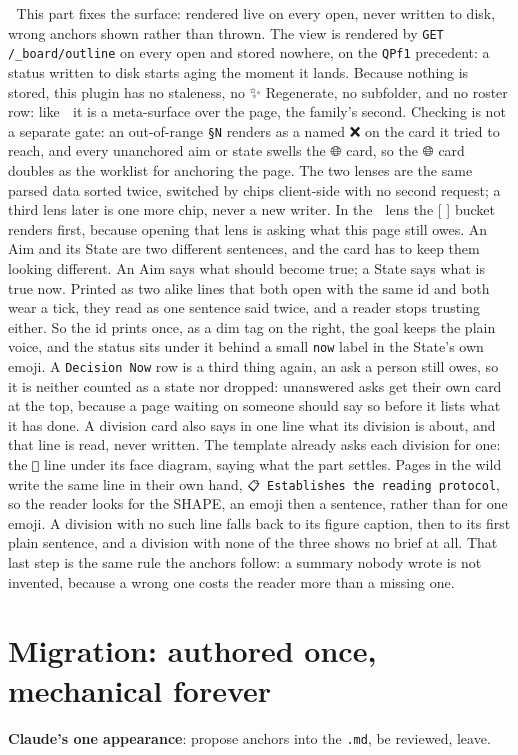 📌 This part fixes the surface: rendered live on every open, never written to disk, wrong anchors shown rather than thrown. The view is rendered by \texttt{GET /\_board/outline} on every open and stored nowhere, on the \texttt{QPf1} precedent: a status written to disk starts aging the moment it lands. Because nothing is stored, this plugin has no staleness, no ✨ Regenerate, no subfolder, and no roster row: like 📂 it is a meta-surface over the page, the family's second. Checking is not a separate gate: an out-of-range \texttt{§N} renders as a named ❌ on the card it tried to reach, and every unanchored aim or state swells the 🌐 card, so the 🌐 card doubles as the worklist for anchoring the page. The two lenses are the same parsed data sorted twice, switched by chips client-side with no second request; a third lens later is one more chip, never a new writer. In the 🚦 lens the [ ] bucket renders first, because opening that lens is asking what this page still owes. An Aim and its State are two different sentences, and the card has to keep them looking different. An Aim says what should become true; a State says what is true now. Printed as two alike lines that both open with the same id and both wear a tick, they read as one sentence said twice, and a reader stops trusting either. So the id prints once, as a dim tag on the right, the goal keeps the plain voice, and the status sits under it behind a small \texttt{now} label in the State's own emoji. A \texttt{Decision Now} row is a third thing again, an ask a person still owes, so it is neither counted as a state nor dropped: unanswered asks get their own card at the top, because a page waiting on someone should say so before it lists what it has done. A division card also says in one line what its division is about, and that line is read, never written. The template already asks each division for one: the \texttt{📌} line under its face diagram, saying what the part settles. Pages in the wild write the same line in their own hand, \texttt{📋 Establishes the reading protocol}, so the reader looks for the SHAPE, an emoji then a sentence, rather than for one emoji. A division with no such line falls back to its figure caption, then to its first plain sentence, and a division with none of the three shows no brief at all. That last step is the same rule the anchors follow: a summary nobody wrote is not invented, because a wrong one costs the reader more than a missing one.


\section{Migration: authored once, mechanical forever}
\textbf{Claude's one appearance}: propose anchors into the \texttt{.md}, be reviewed, leave.

